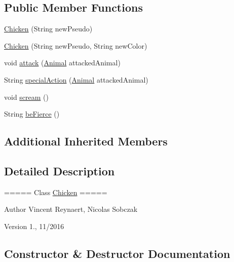 \subsection*{Public Member Functions}
\begin{DoxyCompactItemize}
\item 
\hyperlink{classanimal_package_1_1_chicken_a40c2ff20215142df5863c92b5cda668f}{Chicken} (String new\+Pseudo)
\item 
\hyperlink{classanimal_package_1_1_chicken_ac9d80790ffc67776ea2bf41dd0d1cb8c}{Chicken} (String new\+Pseudo, String new\+Color)
\item 
void \hyperlink{classanimal_package_1_1_chicken_af7083b18b61b5706ac907af79e46990a}{attack} (\hyperlink{classanimal_package_1_1_animal}{Animal} attacked\+Animal)
\item 
String \hyperlink{classanimal_package_1_1_chicken_a14b6e124c1b2655faabf125719113ad1}{special\+Action} (\hyperlink{classanimal_package_1_1_animal}{Animal} attacked\+Animal)
\item 
void \hyperlink{classanimal_package_1_1_chicken_a14f06d93a9c7b0dc32d68bc29d6dd69c}{scream} ()
\item 
String \hyperlink{classanimal_package_1_1_chicken_acbab445b817267020bad14971bc7aade}{be\+Fierce} ()
\end{DoxyCompactItemize}
\subsection*{Additional Inherited Members}


\subsection{Detailed Description}
===== Class \hyperlink{classanimal_package_1_1_chicken}{Chicken} =====

\begin{DoxyAuthor}{Author}
Vincent Reynaert, Nicolas Sobczak 
\end{DoxyAuthor}
\begin{DoxyVersion}{Version}
1., 11/2016 
\end{DoxyVersion}


\subsection{Constructor \& Destructor Documentation}
